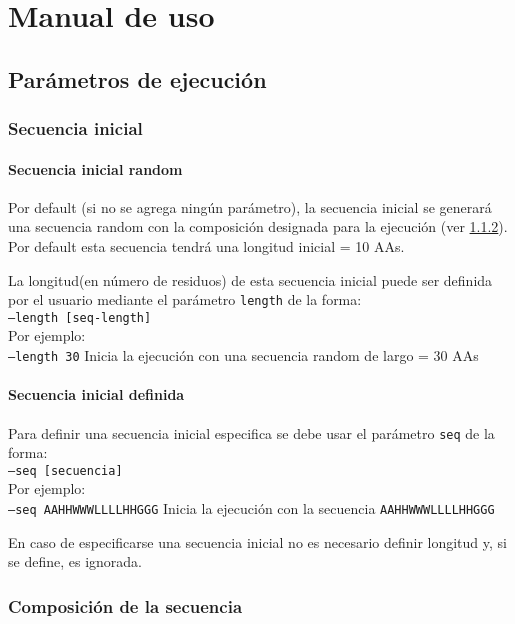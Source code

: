 \chapter{Manual de uso}\label{manual}

\section{Parámetros de ejecución}\label{parametros}
\subsection{Secuencia inicial} \label{secuenciaInicial}
\subsubsection{Secuencia inicial random}\label{secuenciaInicialRandom}
Por default (si no se agrega ningún parámetro), la secuencia inicial se generará una secuencia random con la composición designada para la ejecución (ver \ref{composicion}).\\
Por default esta secuencia tendrá una longitud inicial = 10 AAs.

La longitud(en número de residuos) de esta secuencia inicial puede ser definida por el usuario mediante el parámetro \texttt{length} de la forma: \\
\indent \texttt{--length [seq-length]}
\\Por ejemplo: \\
\indent \texttt{--length 30} \hspace{0.5cm} Inicia la ejecución con una secuencia random de largo = 30 AAs


\subsubsection{Secuencia inicial definida}\label{secuenciaInicialDefinida}
Para definir una secuencia inicial especifica se debe usar el parámetro \texttt{seq} de la forma: \\
\indent \texttt{--seq [secuencia]} 
\\Por ejemplo: \\
\indent \texttt{--seq AAHHWWWLLLLHHGGG} \hspace{0.5cm} Inicia la ejecución con la secuencia \texttt{AAHHWWWLLLLHHGGG}

En caso de especificarse una secuencia inicial no es necesario definir longitud y, si se define, es ignorada.

\subsection{Composición de la secuencia} \label{composicion}

